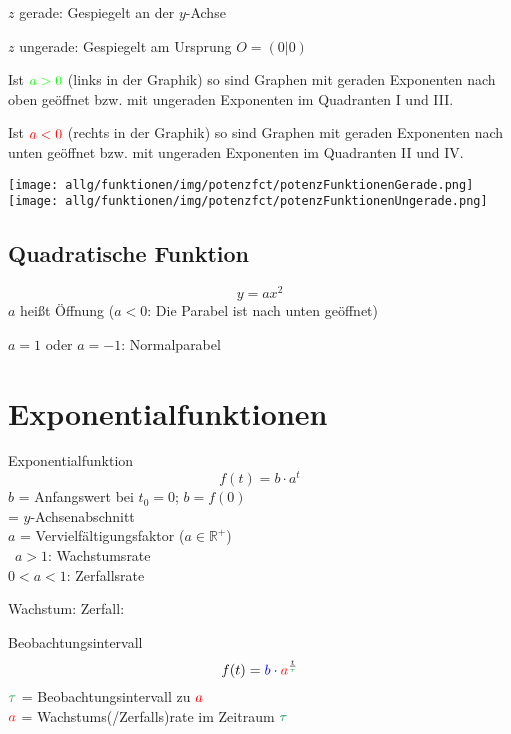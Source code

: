 \begin{multicols}{2}



$z$ gerade: Gespiegelt an der $y$-Achse

$z$ ungerade: Gespiegelt am Ursprung $O=(0|0)$

Ist ${\color{green}a>0}$ (links in der Graphik) so sind Graphen mit
geraden Exponenten nach oben geöffnet bzw. mit ungeraden Exponenten im
Quadranten I und III.

Ist ${\color{red}a<0}$ (rechts in der Graphik) so sind Graphen mit
geraden Exponenten nach unten geöffnet bzw. mit ungeraden Exponenten
im Quadranten II und IV.

 \texttt{[image: allg/funktionen/img/potenzfct/potenzFunktionenGerade.png]}\hfill{}\texttt{[image: allg/funktionen/img/potenzfct/potenzFunktionenUngerade.png]}


\hrulefill  
\subsection*{Quadratische Funktion}
$$y=ax^2$$
$a$ heißt Öffnung ($a<0$: Die Parabel ist nach unten geöffnet)

$a=1$ oder $a=-1$: Normalparabel

\forceCB
\section*{Exponentialfunktionen}
\begin{definition*}{Exponentialfunktion}{}
$$f(t) = b\cdot{}a^t$$
$b$ = Anfangswert bei $t_0=0$; $b=f(0)$\\
\phantom{$b$} = $y$-Achsenabschnitt\\
$a$ = Vervielfältigungsfaktor ($a\in\mathbb{R}^{+}$)\\\
$a>1$: Wachstumsrate\\
$0<a<1$: Zerfallsrate
\end{definition*}

Wachstum:
Zerfall:
\begin{rezept*}{Beobachtungsintervall}{}
$$f(t) = {\color{blue}b}\cdot{}{\color{red}a}^{\frac{t}{\color{ForestGreen}\tau}}$$
$\color{ForestGreen}\tau$ = Beobachtungsintervall zu $\color{red}a$\\
$\color{red}a$ = Wachstums(/Zerfalls)rate im Zeitraum $\color{ForestGreen}\tau$


\end{rezept*}
\end{multicols}
